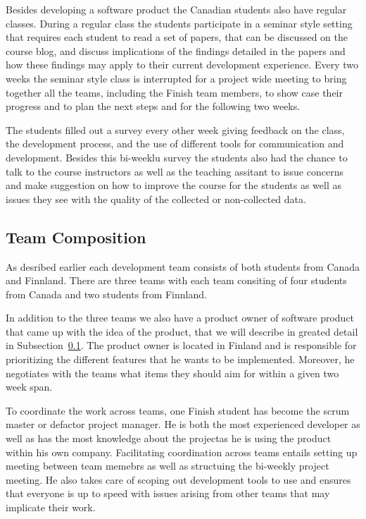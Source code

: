 Besides developing a software product the Canadian students also have regular classes.
During a regular class the students participate in a seminar style setting that requires each student to read a set of papers, that can be discussed on the course blog, and discuss implications of the findings detailed in the papers and how these findings may apply to their current development experience.
Every two weeks the seminar style class is interrupted for a project wide meeting to bring together all the teams, including the Finish team members, to show case their progress and to plan the next steps and for the following two weeks.

The students filled out a survey every other week giving feedback on the class, the development process, and the use of different tools for communication and development.
Besides this bi-weeklu survey the students also had the chance to talk to the course instructors as well as the teaching assitant to issue concerns and make suggestion on how to improve the course for the students as well as issues they see with the quality of the collected or non-collected data.

\subsection{Team Composition}
As desribed earlier each development team consists of both students from Canada and Finnland.
There are three teams with each team consiting of four students from Canada and two students from Finnland.

In addition to the three teams we also have a product owner of software product that came up with the idea of the product, that we will describe in greated detail in Subsection~\ref{}.
The product owner is located in Finland and is responsible for prioritizing the different features that he wants to be implemented.
Moreover, he negotiates with the teams what items they should aim for within a given two week span. 

To coordinate the work across teams, one Finish student has become the scrum master or defactor project manager.
He is both the most experienced developer as well as has the most knowledge about the projectas he is using the product within his own company.
Facilitating coordination across teams entails setting up meeting between team memebrs as well as structuing the bi-weekly project meeting.
He also takes care of scoping out development tools to use and ensures that everyone is up to speed with issues arising from other teams that may implicate their work.

